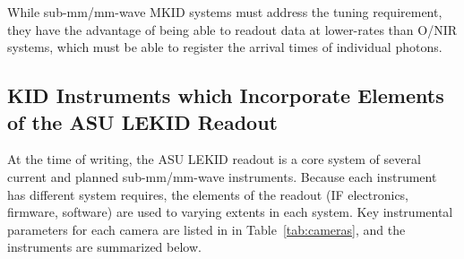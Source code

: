 While sub-mm/mm-wave MKID systems must address the tuning requirement, they have the advantage of being able to readout data at lower-rates than O/NIR systems, which must be able to register the arrival times of individual photons.

\subsection{KID Instruments which Incorporate Elements of the ASU LEKID Readout}

At the time of writing, the ASU LEKID readout is a core system of several current and planned sub-mm/mm-wave instruments. Because each instrument has different system requires, the elements of the readout (IF electronics, firmware, software) are used to varying extents in each system. Key instrumental parameters for each camera are listed in in Table~\ref{tab:cameras}, and the instruments are summarized below.

